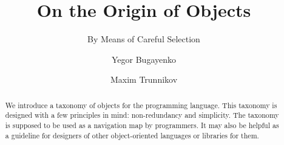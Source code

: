 \documentclass[acmsmall,nonacm,11pt]{acmart}
\title{On the Origin of Objects}
\subtitle{By Means of Careful Selection}
\author{Yegor Bugayenko}
\affiliation{
  \institution{Huawei}
  \country{Russia}
  \city{Moscow}
  }
\author{Maxim Trunnikov}
\affiliation{
  \institution{Huawei}
  \country{Russia}
  \city{Moscow}
  }
\begin{document}
\begin{abstract}
We introduce a taxonomy of objects for the \eolang{} programming language.
This taxonomy is designed with a few principles in mind:
  non-redundancy and simplicity.
The taxonomy is supposed to be used
  as a navigation map by \eolang{} programmers.
It may also be helpful as a guideline for designers
  of other object-oriented languages or libraries for them.
\end{abstract}

\maketitle





































\raggedright


\end{document}
